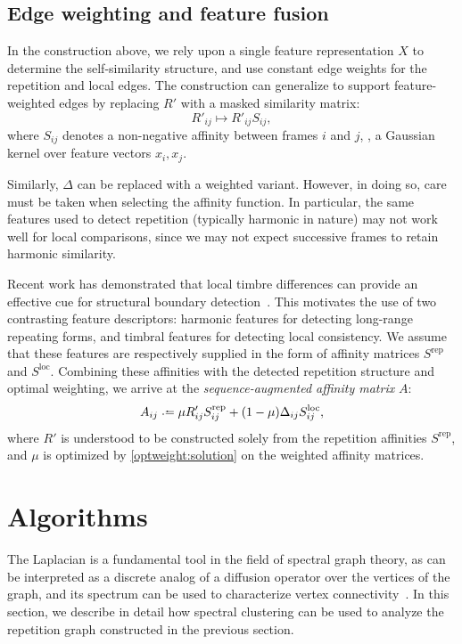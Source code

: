 \documentclass{article}
\begin{document}
\subsection{Edge weighting and feature fusion}
In the construction above, we rely upon a single feature representation $X$ to 
determine the self-similarity structure, and use constant edge weights for the
repetition and local edges.  The construction can generalize to support
feature-weighted edges by replacing $R'$ with a masked similarity matrix:
\begin{equation}
R'_{ij} \mapsto R'_{ij} S_{ij},
\end{equation}
where $S_{ij}$ denotes a non-negative affinity between frames $i$ and $j$, \eg,
a Gaussian kernel over feature vectors $x_i, x_j$.

Similarly, $\Delta$ can be replaced with a weighted variant.  However, in doing so,
care must be taken when selecting the affinity function.  In particular, the same
features used to detect repetition (typically harmonic in nature) may not work well
for local comparisons, since we may not expect successive frames to retain
harmonic similarity.  

Recent work has demonstrated that local timbre differences 
can provide an effective cue for structural boundary
detection~\cite{kaiser2013simple}.  This motivates the use of two contrasting feature
descriptors: harmonic features for detecting long-range repeating forms, and timbral
features for detecting local consistency.  We assume that these features are
respectively supplied in the form of affinity matrices $S^\text{rep}$ and
$S^\text{loc}$.  Combining these affinities with the detected repetition structure and
optimal weighting, we arrive at the \emph{sequence-augmented affinity matrix} $A$:
\begin{equation}
A_{ij} \defeq \mu R'_{ij} S^\text{rep}_{ij} + (1-\mu) \Delta_{ij} S^\text{loc}_{ij},\label{saam}
\end{equation}
where $R'$ is understood to be
constructed solely from the repetition affinities $S^\text{rep}$, and $\mu$ is
optimized by \eqref{optweight:solution} on the weighted affinity matrices.


\section{Algorithms}

The Laplacian is a fundamental tool in the field of spectral graph
theory, as can be interpreted as a discrete analog of a diffusion operator over the
vertices of the graph, and its spectrum can be used to characterize 
vertex connectivity~\cite{chung1997spectral}.  In this section, we describe in detail
how spectral clustering can be used to analyze the repetition graph constructed in the
previous section.
\end{document}
